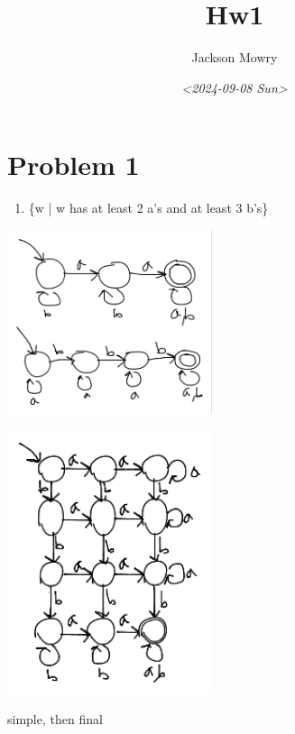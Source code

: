 \documentclass[letterpaper, 12pt]{article}
\author{Jackson Mowry}
\date{\textit{<2024-09-08 Sun>}}
\title{Hw1}
\begin{document}
\maketitle
\tableofcontents

\section{Problem 1}
\label{sec:org04bcb37}
\begin{enumerate}
\item \{w | w has at least 2 a's and at least 3 b's\}
\end{enumerate}
\begin{center}
\includegraphics[width=6cm]{hw2/simple1-1.png}
\end{center}
\begin{center}
\includegraphics[width=6cm]{hw2/1-1.png}
\end{center}
simple, then final
\end{document}
